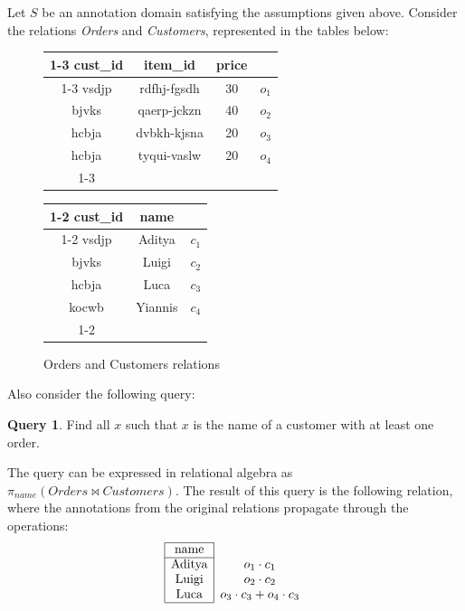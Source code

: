 \documentclass[oneside, 11pt]{amsbook}
\theoremstyle{plain}
\theoremstyle{definition}
\newtheorem{query}[thm]{Query}
\theoremstyle{remark}
\begin{document}
\begin{exmpl}
    Let $S$ be an annotation domain satisfying the assumptions given above. Consider the relations \emph{Orders} and \emph{Customers}, represented in the tables below:
    \begin{figure}[htbp]
        \centering
        \begin{tabular}{|c|c|c|c}
            \cline{1-3}
            cust\_id & item\_id    & price &       \\ \cline{1-3}
            vsdjp    & rdfhj-fgsdh & 30    & $o_1$ \\
            bjvks    & qaerp-jckzn & 40    & $o_2$ \\
            hcbja    & dvbkh-kjsna & 20    & $o_3$ \\
            hcbja    & tyqui-vaslw & 20    & $o_4$ \\ \cline{1-3}
        \end{tabular}
        \qquad
        \begin{tabular}{|c|c|c}
            \cline{1-2}
            cust\_id & name    &       \\ \cline{1-2}
            vsdjp    & Aditya  & $c_1$ \\
            bjvks    & Luigi   & $c_2$ \\
            hcbja    & Luca    & $c_3$ \\
            kocwb    & Yiannis & $c_4$ \\ \cline{1-2}
        \end{tabular}
        \caption{Orders and Customers relations}
        \label{fig:ordersandcustomers}
    \end{figure}

    Also consider the following query:
    \begin{query}
        \label{query:orders}
        Find all $x$ such that $x$ is the name of a customer with at least one order.
    \end{query}

    The query can be expressed in relational algebra as $\pi_{name}(Orders \bowtie Customers)$. The result of this query is the following relation, where the annotations from the original relations propagate through the operations:
    \[
        \begin{array}{|c|c}
            \cline{1-1}
            \text{name}   &                               \\ \cline{1-1}
            \text{Aditya} & o_1 \cdot c_1                 \\
            \text{Luigi}  & o_2 \cdot c_2                 \\
            \text{Luca}   & o_3 \cdot c_3 + o_4 \cdot c_3 \\ \cline{1-1}
        \end{array}
    \]
\end{exmpl}
\end{document}
